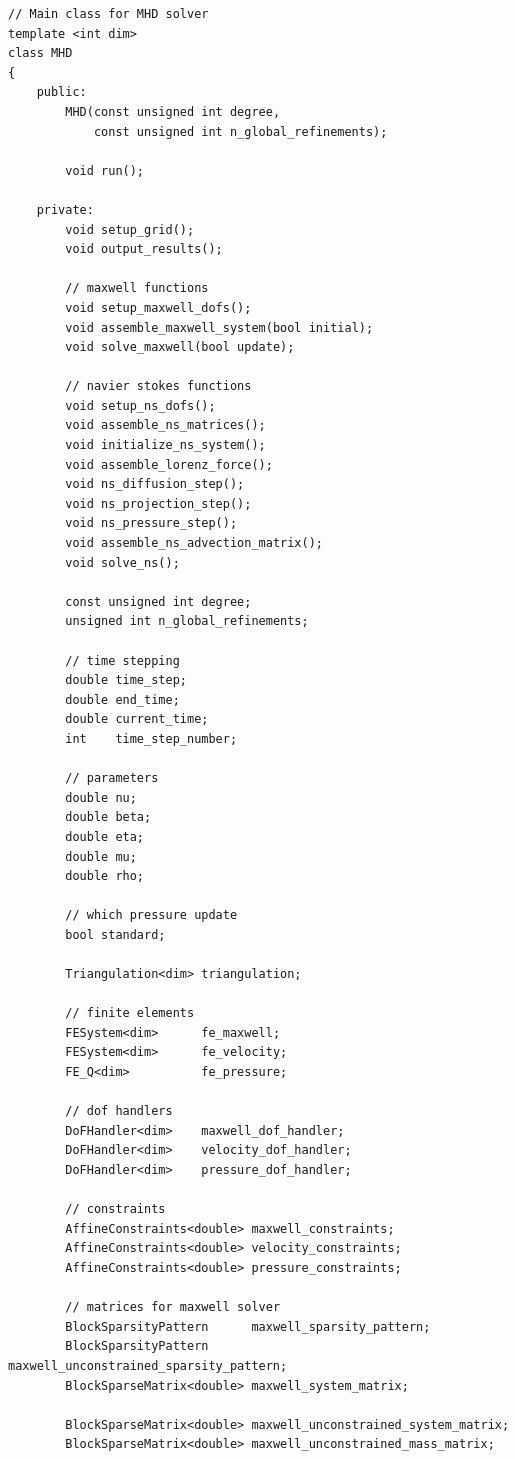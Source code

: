 \documentclass{article}
\begin{document}
\begin{lstlisting}
// Main class for MHD solver
template <int dim>
class MHD
{
    public:
        MHD(const unsigned int degree,
            const unsigned int n_global_refinements);

        void run();

    private:
        void setup_grid();
        void output_results();

        // maxwell functions
        void setup_maxwell_dofs();
        void assemble_maxwell_system(bool initial);
        void solve_maxwell(bool update);

        // navier stokes functions
        void setup_ns_dofs();
        void assemble_ns_matrices();
        void initialize_ns_system();
        void assemble_lorenz_force();
        void ns_diffusion_step();
        void ns_projection_step();
        void ns_pressure_step();
        void assemble_ns_advection_matrix();
        void solve_ns();

        const unsigned int degree;
        unsigned int n_global_refinements;

        // time stepping
        double time_step;
        double end_time;
        double current_time;
        int    time_step_number;

        // parameters
        double nu;
        double beta;
        double eta;
        double mu;
        double rho;

        // which pressure update
        bool standard;

        Triangulation<dim> triangulation;

        // finite elements
        FESystem<dim>      fe_maxwell;
        FESystem<dim>      fe_velocity;
        FE_Q<dim>          fe_pressure;

        // dof handlers
        DoFHandler<dim>    maxwell_dof_handler;
        DoFHandler<dim>    velocity_dof_handler;
        DoFHandler<dim>    pressure_dof_handler;

        // constraints
        AffineConstraints<double> maxwell_constraints;
        AffineConstraints<double> velocity_constraints;
        AffineConstraints<double> pressure_constraints;

        // matrices for maxwell solver
        BlockSparsityPattern      maxwell_sparsity_pattern;
        BlockSparsityPattern      maxwell_unconstrained_sparsity_pattern;
        BlockSparseMatrix<double> maxwell_system_matrix;

        BlockSparseMatrix<double> maxwell_unconstrained_system_matrix;
        BlockSparseMatrix<double> maxwell_unconstrained_mass_matrix;


\end{lstlisting}
\end{document}
